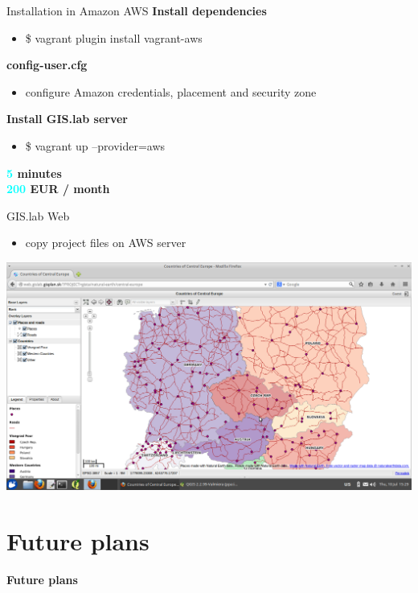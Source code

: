 \documentclass[12pt]{beamer}
\begin{document}
\begin{frame}{Installation in Amazon AWS}
	\textbf{Install dependencies}
	\begin{itemize}
		\item \$ vagrant plugin install vagrant-aws
	\end{itemize}

	\textbf{config-user.cfg}
	\begin{itemize}
		\item configure Amazon credentials, placement and security zone
	\end{itemize}

	\textbf{Install GIS.lab server}
	\begin{itemize}
		\item \$ vagrant up --provider=aws
	\end{itemize}
	
	\begin{flushleft}
		\textbf{\textcolor{Cyan}{5} minutes} \\
		\textbf{\textcolor{Cyan}{200} EUR / month} \\
	\end{flushleft}
\end{frame}


\begin{frame}{GIS.lab Web}
	\begin{itemize}
		\item copy project files on AWS server
	\end{itemize}
	\begin{center}
		\includegraphics[keepaspectratio=true,height=0.7\textheight]{images/rapid-gis-deployment/project-gislab-web-amazon-aws.png}
	\end{center}
\end{frame}


\section{Future plans}
\begin{frame}
	\begin{center}
		\LARGE\textbf{Future plans}
	\end{center}
\end{frame}
\end{document}
